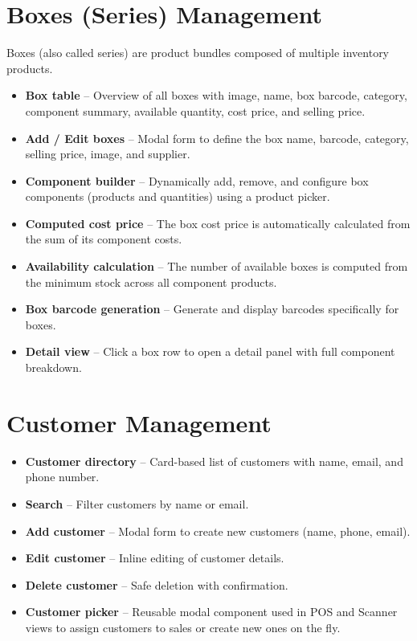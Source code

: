 \documentclass[12pt,a4paper]{article}
\begin{document}
\section{Boxes (Series) Management}

Boxes (also called series) are product bundles composed of multiple inventory
products.

\begin{itemize}[leftmargin=1.5em]
  \item \textbf{Box table} -- Overview of all boxes with image, name, box
        barcode, category, component summary, available quantity, cost price,
        and selling price.
  \item \textbf{Add / Edit boxes} -- Modal form to define the box name,
        barcode, category, selling price, image, and supplier.
  \item \textbf{Component builder} -- Dynamically add, remove, and configure
        box components (products and quantities) using a product picker.
  \item \textbf{Computed cost price} -- The box cost price is automatically
        calculated from the sum of its component costs.
  \item \textbf{Availability calculation} -- The number of available boxes is
        computed from the minimum stock across all component products.
  \item \textbf{Box barcode generation} -- Generate and display barcodes
        specifically for boxes.
  \item \textbf{Detail view} -- Click a box row to open a detail panel with
        full component breakdown.
\end{itemize}

\section{Customer Management}

\begin{itemize}[leftmargin=1.5em]
  \item \textbf{Customer directory} -- Card-based list of customers with name,
        email, and phone number.
  \item \textbf{Search} -- Filter customers by name or email.
  \item \textbf{Add customer} -- Modal form to create new customers (name,
        phone, email).
  \item \textbf{Edit customer} -- Inline editing of customer details.
  \item \textbf{Delete customer} -- Safe deletion with confirmation.
  \item \textbf{Customer picker} -- Reusable modal component used in POS and
        Scanner views to assign customers to sales or create new ones on the
        fly.
\end{itemize}
\end{document}
